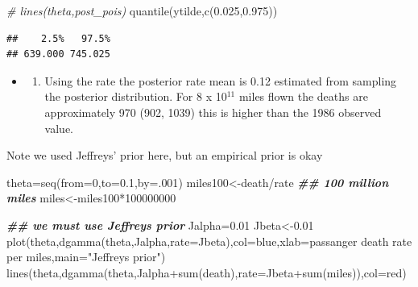 \documentclass[
]{book}
\newenvironment{Shaded}{\begin{snugshade}}{\end{snugshade}}
\newcommand{\AttributeTok}[1]{\textcolor[rgb]{0.77,0.63,0.00}{#1}}
\newcommand{\CommentTok}[1]{\textcolor[rgb]{0.56,0.35,0.01}{\textit{#1}}}
\newcommand{\DecValTok}[1]{\textcolor[rgb]{0.00,0.00,0.81}{#1}}
\newcommand{\DocumentationTok}[1]{\textcolor[rgb]{0.56,0.35,0.01}{\textbf{\textit{#1}}}}
\newcommand{\FloatTok}[1]{\textcolor[rgb]{0.00,0.00,0.81}{#1}}
\newcommand{\FunctionTok}[1]{\textcolor[rgb]{0.00,0.00,0.00}{#1}}
\newcommand{\NormalTok}[1]{#1}
\newcommand{\OtherTok}[1]{\textcolor[rgb]{0.56,0.35,0.01}{#1}}
\newcommand{\SpecialCharTok}[1]{\textcolor[rgb]{0.00,0.00,0.00}{#1}}
\newcommand{\StringTok}[1]{\textcolor[rgb]{0.31,0.60,0.02}{#1}}
\providecommand{\tightlist}{%
  \setlength{\itemsep}{0pt}\setlength{\parskip}{0pt}}
\theoremstyle{definition}
\theoremstyle{definition}
\theoremstyle{definition}
\theoremstyle{definition}
\theoremstyle{remark}
\begin{document}
\begin{Shaded}
\begin{Highlighting}[]
\CommentTok{\# lines(theta,post\_pois)}
 \FunctionTok{quantile}\NormalTok{(ytilde,}\FunctionTok{c}\NormalTok{(}\FloatTok{0.025}\NormalTok{,}\FloatTok{0.975}\NormalTok{))}
\end{Highlighting}
\end{Shaded}

\begin{verbatim}
##    2.5%   97.5% 
## 639.000 745.025
\end{verbatim}

\begin{itemize}
\item
  \begin{enumerate}
  \def\labelenumi{(\alph{enumi})}
  \setcounter{enumi}{3}
  \tightlist
  \item
    Using the rate the posterior rate mean is 0.12 estimated from sampling the posterior distribution. For 8 x 10\(^11\) miles flown the deaths are approximately 970 (902, 1039) this is higher than the 1986 observed value.
  \end{enumerate}
\end{itemize}

Note we used Jeffreys' prior here, but an empirical prior is okay

\begin{Shaded}
\begin{Highlighting}[]
\NormalTok{  theta}\OtherTok{=}\FunctionTok{seq}\NormalTok{(}\AttributeTok{from=}\DecValTok{0}\NormalTok{,}\AttributeTok{to=}\FloatTok{0.1}\NormalTok{,}\AttributeTok{by=}\NormalTok{.}\DecValTok{001}\NormalTok{)}
\NormalTok{ miles100}\OtherTok{\textless{}{-}}\NormalTok{death}\SpecialCharTok{/}\NormalTok{rate }\DocumentationTok{\#\# 100 million miles}
\NormalTok{ miles}\OtherTok{\textless{}{-}}\NormalTok{miles100}\SpecialCharTok{*}\DecValTok{100000000}

 


   
  \DocumentationTok{\#\# we must use Jeffreys\textquotesingle{} prior}
\NormalTok{    Jalpha}\OtherTok{=}\FloatTok{0.01}
\NormalTok{  Jbeta}\OtherTok{\textless{}{-}}\FloatTok{0.01}
 \FunctionTok{plot}\NormalTok{(theta,}\FunctionTok{dgamma}\NormalTok{(theta,Jalpha,}\AttributeTok{rate=}\NormalTok{Jbeta),}\AttributeTok{col=}\StringTok{\textquotesingle{}blue\textquotesingle{}}\NormalTok{,}\AttributeTok{xlab=}\StringTok{\textquotesingle{}passanger death rate per miles\textquotesingle{}}\NormalTok{,}\AttributeTok{main=}\StringTok{"Jeffreys\textquotesingle{} prior"}\NormalTok{)}
\FunctionTok{lines}\NormalTok{(theta,}\FunctionTok{dgamma}\NormalTok{(theta,Jalpha}\SpecialCharTok{+}\FunctionTok{sum}\NormalTok{(death),}\AttributeTok{rate=}\NormalTok{Jbeta}\SpecialCharTok{+}\FunctionTok{sum}\NormalTok{(miles)),}\AttributeTok{col=}\StringTok{\textquotesingle{}red\textquotesingle{}}\NormalTok{)}
\end{Highlighting}
\end{Shaded}
\end{document}
